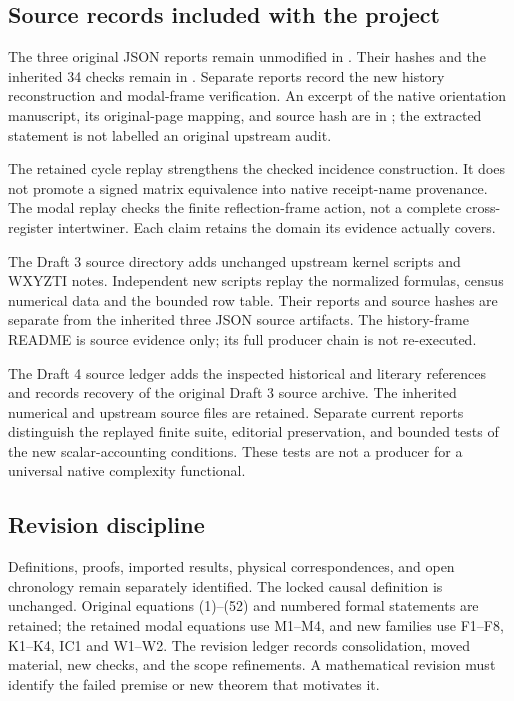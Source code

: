 \subsection{Source records included with the project}
The three original JSON reports remain unmodified in . Their hashes and the inherited 34 checks remain in . Separate reports record the new history reconstruction and modal-frame verification. An excerpt of the native orientation manuscript, its original-page mapping, and source hash are in ; the extracted statement is not labelled an original upstream audit.

The retained cycle replay strengthens the checked incidence construction. It does not promote a signed matrix equivalence into native receipt-name provenance. The modal replay checks the finite reflection-frame action, not a complete cross-register intertwiner. Each claim retains the domain its evidence actually covers.

The Draft 3 source directory adds unchanged upstream kernel scripts and WXYZTI notes. Independent new scripts replay the normalized formulas, census numerical data and the bounded row table. Their reports and source hashes are separate from the inherited three JSON source artifacts. The history-frame README is source evidence only; its full producer chain is not re-executed.

The Draft 4 source ledger adds the inspected historical and literary references and records recovery of the original Draft 3 source archive. The inherited numerical and upstream source files are retained. Separate current reports distinguish the replayed finite suite, editorial preservation, and bounded tests of the new scalar-accounting conditions. These tests are not a producer for a universal native complexity functional.

\subsection{Revision discipline}
Definitions, proofs, imported results, physical correspondences, and open chronology remain separately identified. The locked causal definition is unchanged. Original equations (1)--(52) and numbered formal statements are retained; the retained modal equations use M1--M4, and new families use F1--F8, K1--K4, IC1 and W1--W2. The revision ledger records consolidation, moved material, new checks, and the scope refinements. A mathematical revision must identify the failed premise or new theorem that motivates it.

